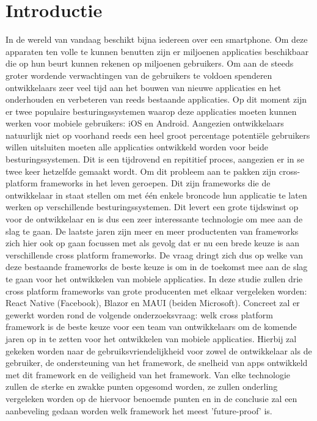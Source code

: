 
\section{Introductie} %
\label{sec:introductie}

In de wereld van vandaag beschikt bijna iedereen over een smartphone. Om deze apparaten ten volle te kunnen benutten zijn er miljoenen applicaties beschikbaar die op hun beurt kunnen rekenen op miljoenen gebruikers. Om aan de steeds groter wordende verwachtingen van de gebruikers te voldoen spenderen ontwikkelaars zeer veel tijd aan het bouwen van nieuwe applicaties en het onderhouden en verbeteren van reeds bestaande applicaties. Op dit moment zijn er twee populaire besturingssystemen waarop deze applicaties moeten kunnen werken voor mobiele gebruikers: iOS en Android. Aangezien ontwikkelaars natuurlijk niet op voorhand reeds een heel groot percentage potentiële gebruikers willen uitsluiten moeten alle applicaties ontwikkeld worden voor beide besturingssystemen. Dit is een tijdrovend en repititief proces, aangezien er in se twee keer hetzelfde gemaakt wordt. Om dit probleem aan te pakken zijn cross-platform frameworks in het leven geroepen. Dit zijn frameworks die de ontwikkelaar in staat stellen om met één enkele broncode hun applicatie te laten werken op verschillende besturingssystemen. Dit levert een grote tijdswinst op voor de ontwikkelaar en is dus een zeer interessante technologie om mee aan de slag te gaan. De laatste jaren zijn meer en meer productenten van frameworks zich hier ook op gaan focussen met als gevolg dat er nu een brede keuze is aan verschillende cross platform frameworks. De vraag dringt zich dus op welke van deze bestaande frameworks de beste keuze is om in de toekomst mee aan de slag te gaan voor het ontwikkelen van mobiele applicaties. In deze studie zullen drie cross platform frameworks van grote producenten met elkaar vergeleken worden: React Native (Facebook), Blazor en MAUI (beiden Microsoft). Concreet zal er gewerkt worden rond de volgende onderzoeksvraag: welk cross platform framework is de beste keuze voor een team van ontwikkelaars om de komende jaren op in te zetten voor het ontwikkelen van mobiele applicaties. Hierbij zal gekeken worden naar de gebruiksvriendelijkheid voor zowel de ontwikkelaar als de gebruiker, de ondersteuning van het framework, de snelheid van apps ontwikkeld met dit framework en de veiligheid van het framework. Van elke technologie zullen de sterke en zwakke punten opgesomd worden, ze zullen onderling vergeleken worden op de hiervoor benoemde punten en in de conclusie zal een aanbeveling gedaan worden welk framework het meest 'future-proof' is. 

